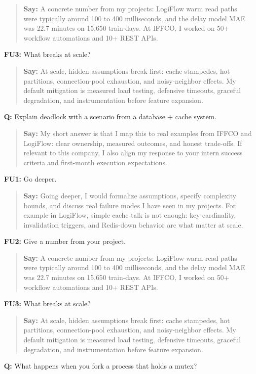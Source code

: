 \documentclass[9pt,a4paper]{article}
\begin{document}
\begin{quote}\small\textbf{Say:} A concrete number from my projects: LogiFlow warm read paths were typically around 100 to 400 milliseconds, and the delay model MAE was 22.7 minutes on 15,650 train-days. At IFFCO, I worked on 50+ workflow automations and 10+ REST APIs.\end{quote}
\vspace{2mm}
\textbf{FU3:} What breaks at scale?

\begin{quote}\small\textbf{Say:} At scale, hidden assumptions break first: cache stampedes, hot partitions, connection-pool exhaustion, and noisy-neighbor effects. My default mitigation is measured load testing, defensive timeouts, graceful degradation, and instrumentation before feature expansion.\end{quote}
\vspace{2mm}
\textbf{Q:} Explain deadlock with a scenario from a database + cache system.

\begin{quote}\small\textbf{Say:} My short answer is that I map this to real examples from IFFCO and LogiFlow: clear ownership, measured outcomes, and honest trade-offs. If relevant to this company, I also align my response to your intern success criteria and first-month execution expectations.\end{quote}
\vspace{2mm}
\textbf{FU1:} Go deeper.

\begin{quote}\small\textbf{Say:} Going deeper, I would formalize assumptions, specify complexity bounds, and discuss real failure modes I have seen in my projects. For example in LogiFlow, simple cache talk is not enough: key cardinality, invalidation triggers, and Redis-down behavior are what matter at scale.\end{quote}
\vspace{2mm}
\textbf{FU2:} Give a number from your project.

\begin{quote}\small\textbf{Say:} A concrete number from my projects: LogiFlow warm read paths were typically around 100 to 400 milliseconds, and the delay model MAE was 22.7 minutes on 15,650 train-days. At IFFCO, I worked on 50+ workflow automations and 10+ REST APIs.\end{quote}
\vspace{2mm}
\textbf{FU3:} What breaks at scale?

\begin{quote}\small\textbf{Say:} At scale, hidden assumptions break first: cache stampedes, hot partitions, connection-pool exhaustion, and noisy-neighbor effects. My default mitigation is measured load testing, defensive timeouts, graceful degradation, and instrumentation before feature expansion.\end{quote}
\vspace{2mm}
\textbf{Q:} What happens when you fork a process that holds a mutex?
\end{document}
